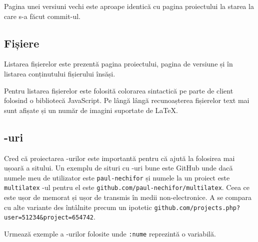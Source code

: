 \documentclass[a4wide,12pt]{report}
\newcommand{\eng}[1]{{#1}} %
\newcommand{\cod}[1]{\texttt{#1}}
\newcommand{\acr}[1]{{\textsmaller[1]{\textsc{#1}}}} %
\begin{document}
Pagina unei versiuni vechi este aproape identică cu pagina proiectului la
starea la care s-a făcut \eng{commit}-ul.

\subsection{Fișiere}

Listarea fișierelor este prezentă pagina proiectului, pagina de versiune și
în listarea conținutului fișierului însăși.

Pentru listarea fișierelor este folosită colorarea sintactică pe parte de client
folosind o bibliotecă JavaScript. Pe lângă lângă recunoașterea fișierelor text mai
sunt afișate și un număr de imagini suportate de \LaTeX{}.

\subsection{\acr{URL}-uri}

Cred că proiectarea \acr{URL}-urilor este importantă pentru că ajută la
folosirea mai ușoară a sitului. Un exemplu de situri cu \acr{URL}-uri bune este
GitHub unde dacă numele meu de utilizator este \cod{paul-nechifor} și numele la
un proiect este \cod{multilatex} \acr{URL}-ul pentru el este
\cod{github.com/paul-nechifor/multilatex}. Ceea ce este ușor de memorat și ușor
de transmis în medii non-electronice. A se compara cu alte variante des
întâlnite precum un ipotetic
\cod{github.com/projects.php?user=51234\&project=654742}.

Urmează exemple a \acr{URL}-urilor folosite unde \cod{:nume} reprezintă o
variabilă.
\end{document}
